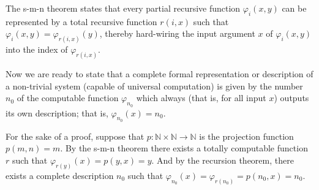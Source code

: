 The s-m-n theorem states that every partial recursive function $\varphi_i (x,y)$
can be represented by a total recursive function $r(i,x)$ such that
$\varphi_i (x,y)= \varphi_{r(i,x)} (y)$,
thereby hard-wiring the input argument $x$ of $\varphi_i (x,y)$ into the index of $\varphi_{r(i,x)}$.


Now we are ready to state that
a complete formal representation or description of a non-trivial system (capable of universal computation)
is given by the number ${n_0}$ of the computable function $\varphi_{n_0}$ which always (that is,
for all input $x$) outputs its own description; that is, $\varphi_{n_0} (x) = {n_0}$.

For the sake of a proof, suppose
that $p: {\mathbb N} \times {\mathbb N}  \longrightarrow {\mathbb N}$ is the projection function
$p(m,n)= m$.
By the s-m-n theorem there exists a totally computable function $r$ such that
$\varphi_{r(y)}(x) = p(y,x)=y$.
And by the recursion theorem,
there exists a complete description
${n_0}$ such that $\varphi_{n_0}(x)=\varphi_{r({n_0})}= p({n_0},x)= {n_0}$.
